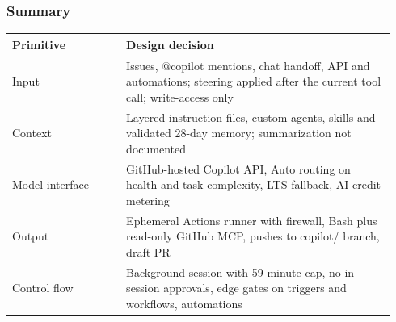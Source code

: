 \subsubsection*{Summary}
\begin{longtable}{@{}p{0.28\linewidth}p{0.66\linewidth}@{}}
\toprule \textbf{Primitive} & \textbf{Design decision} \\ \midrule \endhead
Input & Issues, @copilot mentions, chat handoff, API and automations; steering applied after the current tool call; write-access only \\
Context & Layered instruction files, custom agents, skills and validated 28-day memory; summarization not documented \\
Model interface & GitHub-hosted Copilot API, Auto routing on health and task complexity, LTS fallback, AI-credit metering \\
Output & Ephemeral Actions runner with firewall, Bash plus read-only GitHub MCP, pushes to copilot/ branch, draft PR \\
Control flow & Background session with 59-minute cap, no in-session approvals, edge gates on triggers and workflows, automations \\
\bottomrule \end{longtable}


\normalsize
